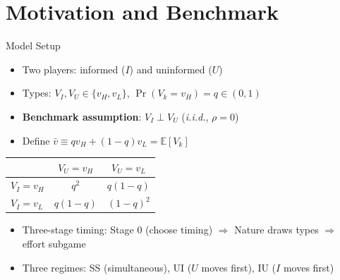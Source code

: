 \documentclass[aspectratio=169, 12pt]{beamer}
\newcommand{\E}{\mathbb{E}}
\begin{document}
\section{Motivation and Benchmark}

\begin{frame}{Model Setup}
  \begin{itemize}
    \item Two players: informed ($I$) and uninformed ($U$)
    \item Types: $V_I, V_U \in \{v_H, v_L\}$,
      $\Pr(V_k = v_H) = q \in (0,1)$
    \item \textbf{Benchmark assumption}: $V_I \perp V_U$
      (\textit{i.i.d.}, $\rho = 0$)
    \item Define $\bar v \equiv q v_H + (1-q) v_L = \E[V_k]$
  \end{itemize}

  \begin{center}
    \small
    \begin{tabular}{@{}lcc@{}}
      \toprule
      & $V_U = v_H$ & $V_U = v_L$ \\
      \midrule
      $V_I = v_H$ & $q^2$ & $q(1-q)$ \\
      $V_I = v_L$ & $q(1-q)$ & $(1-q)^2$ \\
      \bottomrule
    \end{tabular}
  \end{center}

  \begin{itemize}
    \item Three-stage timing: Stage 0 (choose timing) $\Rightarrow$
      Nature draws types $\Rightarrow$ effort subgame
    \item Three regimes: SS (simultaneous), UI ($U$ moves first),
      IU ($I$ moves first)
  \end{itemize}
\end{frame}
\end{document}
